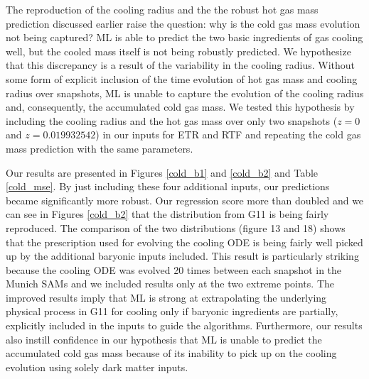 \documentclass[a4paper,fleqn,usenatbib]{mnras}
\begin{document}
\par The reproduction of the cooling radius and the the robust hot gas mass prediction discussed earlier raise the question: why is the cold gas mass evolution not being captured? ML is able to predict the two basic ingredients of gas cooling well, but the cooled mass itself is not being robustly predicted. We hypothesize that this discrepancy is a result of the variability in the cooling radius. Without some form of explicit inclusion of the time evolution of hot gas mass and cooling radius over snapshots, ML is unable to capture the evolution of the cooling radius and, consequently, the accumulated cold gas mass. We tested this hypothesis by including the cooling radius and the hot gas mass over only two snapshots ($z=0$ and $z=0.019932542$) in our inputs for ETR and RTF and repeating the cold gas mass prediction with the same parameters. 

\par Our results are presented in Figures \ref{cold_b1} and \ref{cold_b2} and Table \ref{cold_mse}. By just including these four additional inputs, our predictions became significantly more robust. Our regression score more than doubled and we can see in Figures \ref{cold_b2} that the distribution from G11 is being fairly reproduced. The comparison of the two distributions (figure 13 and 18) shows that the prescription used for evolving the cooling ODE is being fairly well picked up by the additional baryonic inputs included. This result is particularly striking because the cooling ODE was evolved 20 times between each snapshot in the Munich SAMs \citep{de2010semi, knebe2015nifty} and we included results only at the two extreme points. The improved results imply that ML is strong at extrapolating the underlying physical process in G11 for cooling only if baryonic ingredients are partially, explicitly included in the inputs to guide the algorithms. Furthermore, our results also instill confidence in our hypothesis that ML is unable to predict the accumulated cold gas mass because of its inability to pick up on the cooling evolution using solely dark matter inputs. 
\end{document}
